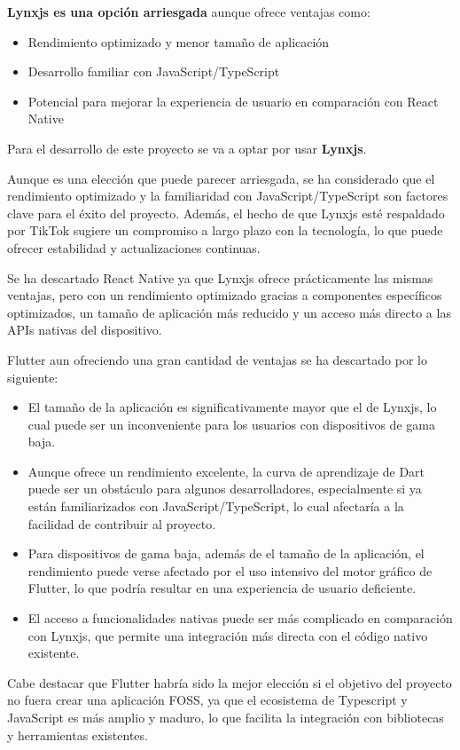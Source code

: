 \textbf{Lynxjs es una opción arriesgada} aunque ofrece ventajas como:
\begin{itemize}
    \item Rendimiento optimizado y menor tamaño de aplicación
    \item Desarrollo familiar con JavaScript/TypeScript
    \item Potencial para mejorar la experiencia de usuario en comparación con React Native
\end{itemize}

Para el desarrollo de este proyecto se va a optar por usar \textbf{Lynxjs}.

Aunque es una elección que puede parecer arriesgada, se ha considerado que el rendimiento optimizado y la familiaridad con JavaScript/TypeScript son factores clave para el éxito del proyecto.
Además, el hecho de que Lynxjs esté respaldado por TikTok sugiere un compromiso a largo plazo con la tecnología, lo que puede ofrecer estabilidad y actualizaciones continuas.

Se ha descartado React Native ya que Lynxjs ofrece prácticamente las mismas ventajas, pero con un rendimiento optimizado gracias a componentes específicos optimizados, un tamaño de aplicación más reducido y un acceso más directo a las APIs nativas del dispositivo.

Flutter aun ofreciendo una gran cantidad de ventajas se ha descartado por lo siguiente:
\begin{itemize}
    \item El tamaño de la aplicación es significativamente mayor que el de Lynxjs, lo cual puede ser un inconveniente para los usuarios con dispositivos de gama baja.
    \item Aunque ofrece un rendimiento excelente, la curva de aprendizaje de Dart puede ser un obstáculo para algunos desarrolladores, especialmente si ya están familiarizados con JavaScript/TypeScript, lo cual afectaría a la facilidad de contribuir al proyecto.
    \item Para dispositivos de gama baja, además de el tamaño de la aplicación, el rendimiento puede verse afectado por el uso intensivo del motor gráfico de Flutter, lo que podría resultar en una experiencia de usuario deficiente.
    \item El acceso a funcionalidades nativas puede ser más complicado en comparación con Lynxjs, que permite una integración más directa con el código nativo existente.
\end{itemize}
Cabe destacar que Flutter habría sido la mejor elección si el objetivo del proyecto no fuera crear una aplicación FOSS, ya que el ecosistema de Typescript y JavaScript es más amplio y maduro, lo que facilita la integración con bibliotecas y herramientas existentes.

